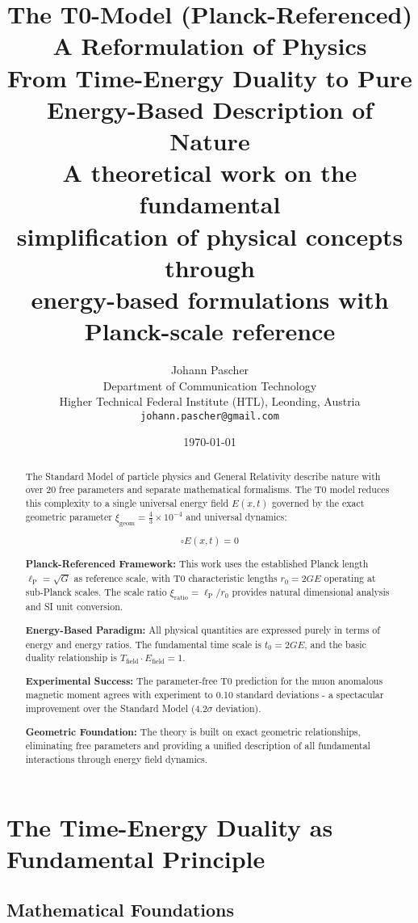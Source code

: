 \documentclass[12pt,a4paper]{report}
\title{
	{\Huge The T0-Model (Planck-Referenced)}\\
	{\LARGE A Reformulation of Physics}\\
	{\Large From Time-Energy Duality to Pure\\Energy-Based Description of Nature}\\
	\vspace{1cm}
	{\large A theoretical work on the fundamental\\simplification of physical concepts through\\energy-based formulations with Planck-scale reference}
}
\author{
	{\Large Johann Pascher}\\
	Department of Communication Technology\\
	Higher Technical Federal Institute (HTL), Leonding, Austria\\
	\texttt{johann.pascher@gmail.com}
}
\date{\today}
\newcommand{\Efield}{E(x,t)}              %
\newcommand{\lP}{\ell_{\text{P}}}         %
\newcommand{\rzero}{r_0}                  %
\newcommand{\tzero}{t_0}                  %
\newcommand{\xigeom}{\xi_{\text{geom}}}   %
\newcommand{\xirat}{\xi_{\text{ratio}}}   %
\begin{document}
	
	\maketitle
	
	\begin{abstract}
		The Standard Model of particle physics and General Relativity describe nature with over 20 free parameters and separate mathematical formalisms. The T0 model reduces this complexity to a single universal energy field $\Efield$ governed by the exact geometric parameter $\xigeom = \frac{4}{3} \times 10^{-4}$ and universal dynamics:
		
		\begin{equation}
			\square \Efield = 0
		\end{equation}
		
		\textbf{Planck-Referenced Framework:} This work uses the established Planck length $\lP = \sqrt{G}$ as reference scale, with T0 characteristic lengths $\rzero = 2GE$ operating at sub-Planck scales. The scale ratio $\xirat = \lP/\rzero$ provides natural dimensional analysis and SI unit conversion.
		
		\textbf{Energy-Based Paradigm:} All physical quantities are expressed purely in terms of energy and energy ratios. The fundamental time scale is $\tzero = 2GE$, and the basic duality relationship is $T_{\text{field}} \cdot E_{\text{field}} = 1$.
		
		\textbf{Experimental Success:} The parameter-free T0 prediction for the muon anomalous magnetic moment agrees with experiment to 0.10 standard deviations - a spectacular improvement over the Standard Model (4.2$\sigma$ deviation).
		
		\textbf{Geometric Foundation:} The theory is built on exact geometric relationships, eliminating free parameters and providing a unified description of all fundamental interactions through energy field dynamics.
	\end{abstract}
	
	\tableofcontents
	
	\chapter{The Time-Energy Duality as Fundamental Principle}\label{chap:time_energy_duality}
	
	\section{Mathematical Foundations}\label{sec:mathematical_foundations}
	
\end{document}
